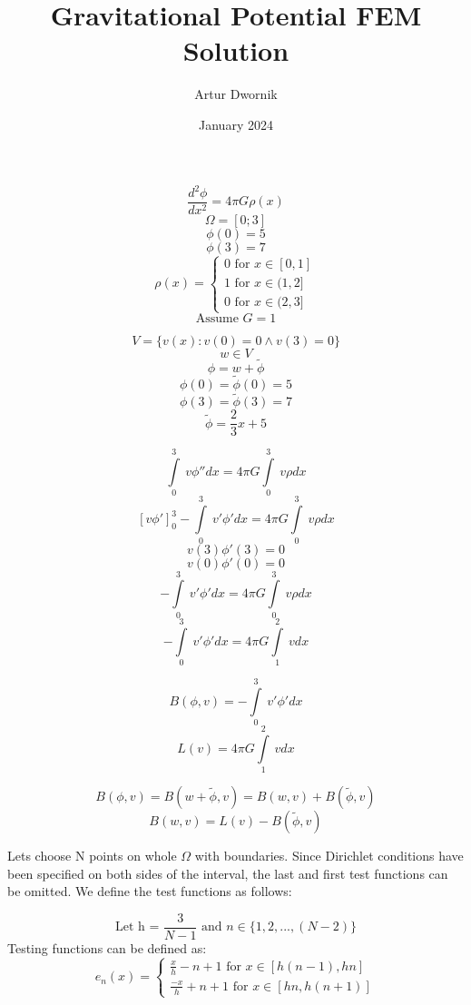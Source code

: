 \documentclass{article}
\title{Gravitational Potential FEM Solution}
\author{Artur Dwornik}
\date{January 2024}
\begin{document}
\maketitle


\[\frac{d^2 \phi}{d x^2} = 4 \pi G \rho(x)\]
\[\Omega = [0; 3]\]
\[\phi(0) = 5\]
\[\phi(3) = 7\]
\[\rho(x) = \begin{cases} 0 \text{ for } x \in [0, 1] \\ 1 \text{ for } x \in (1, 2] \\ 0 \text{ for } x \in (2, 3] \end{cases}\]
\[\text{Assume } G = 1\]

\[V = \{v(x) : v(0) = 0 \land v(3) = 0\}\]
\[w \in V\]
\[\phi = w + \tilde{\phi}\]
\[\phi(0) = \tilde{\phi}(0) = 5\]
\[\phi(3) = \tilde{\phi}(3) = 7\]
\[\tilde{\phi} = \frac{2}{3} x + 5\]

\[\int\limits_0^3\ v \phi'' dx = 4 \pi G \int\limits_0^3\ v \rho dx \]
\[\left[v \phi'\right]_0^3 - \int\limits_0^3\ v' \phi' dx = 4 \pi G \int\limits_0^3\ v \rho dx\]
\[v(3) \phi'(3) = 0\]
\[v(0) \phi'(0) = 0\]
\[- \int\limits_0^3\ v' \phi' dx = 4 \pi G \int\limits_0^3\ v \rho dx\]
\[- \int\limits_0^3\ v' \phi' dx = 4 \pi G \int\limits_1^2\ v dx\]

\[B(\phi, v) = - \int\limits_0^3\ v' \phi' dx\]
\[L(v) = 4 \pi G \int\limits_1^2\ v dx\]

\[B(\phi, v) = B(w + \tilde{\phi}, v) = B(w, v) + B(\tilde{\phi}, v)\]
\[B(w, v) = L(v) - B(\tilde{\phi}, v)\]


Lets choose N points on whole $\Omega$ with boundaries. Since Dirichlet conditions have been specified on both sides of the interval, the last and first test functions can be omitted. We define the test functions as follows:

\[\text{Let h = } \frac{3}{N - 1} \text{ and } n \in \{1, 2, ..., (N - 2)\}\]
Testing functions can be defined as:
\[e_n(x) = \begin{cases} \frac{x}{h} - n + 1 \text{ for } x \in [h(n - 1), hn] \\ \frac{-x}{h} + n + 1 \text{ for } x \in [hn, h(n + 1)] \end{cases}\]
\end{document}
